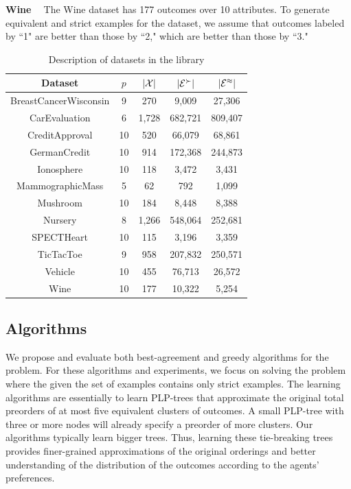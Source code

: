 \smallskip \noindent \textbf{Wine \ }
The Wine dataset has 177 outcomes over 10 attributes.
To generate equivalent and strict examples for the dataset,
we assume that outcomes labeled by ``1" are better than
those by ``2," which are better than those
by ``3."


\begin{table}
	\centering
	\small
	\caption{Description of datasets in the library}
	\begin{tabular}{ |c||c|c|c|c| } 
		\hline
		Dataset          & $p$  & $|\mathcal{X}|$ & $|\mathcal{E}^\succ|$ & $|\mathcal{E}^\approx|$ \\
		\hline \hline
		BreastCancerWisconsin              & 9    & 270 & 9,009 & 27,306 \\ \hline
		CarEvaluation               & 6    & 1,728 & 682,721 & 809,407\\ \hline
		CreditApproval               & 10   & 520 & 66,079 & 68,861 \\ \hline
		GermanCredit               & 10   & 914 & 172,368 & 244,873 \\ \hline
		Ionosphere               & 10   & 118 & 3,472 & 3,431 \\	\hline
		MammographicMass               & 5    & 62 & 792 & 1,099 \\	\hline
		Mushroom               & 10   & 184 & 8,448 & 8,388 \\	\hline
		Nursery               & 8    & 1,266 & 548,064 & 252,681 \\	\hline
		SPECTHeart               & 10   & 115 & 3,196 & 3,359 \\	\hline
		TicTacToe              & 9    & 958 & 207,832 & 250,571 \\ \hline
		Vehicle               & 10   & 455 & 76,713 & 26,572 \\ \hline
		Wine               & 10   & 177 & 10,322 & 5,254 \\
		\hline
	\end{tabular}
	\label{tbl:description}
\end{table}


\subsection{Algorithms}
\label{sec:algs}
We propose and evaluate both best-agreement and 
greedy algorithms for the  problem. 
For these algorithms and experiments, we focus on solving the
 problem where the given the set of examples
contains only strict examples.
The learning algorithms are essentially to learn PLP-trees that
approximate the original total preorders of at most five
equivalent clusters of outcomes.
A small PLP-tree with three or more nodes will already specify
a preorder of more clusters.
Our algorithms typically learn bigger trees.
Thus, learning these tie-breaking trees provides finer-grained
approximations of the original orderings and better
understanding of the distribution of the outcomes according
to the agents' preferences.

